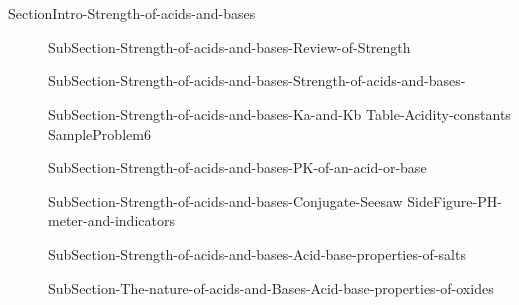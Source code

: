 \documentclass[main.tex]{subfiles}
\newcommand\chapterlabel{Ch-acidbase}\setcounter{figurenewcounter}{0}\setcounter{tablenewcounter}{0}\setcounter{formulanewcounter}{0}
\begin{document}
\section{\color{blue!30!black}{Strength of acids and bases}}{SectionIntro-Strength-of-acids-and-bases}
\sloppy\begin{description}
\item[] {SubSection-Strength-of-acids-and-bases-Review-of-Strength}
\item[] {SubSection-Strength-of-acids-and-bases-Strength-of-acids-and-bases-}
\item[] {SubSection-Strength-of-acids-and-bases-Ka-and-Kb}
  \newpage\hspace{4cm}  {Table-Acidity-constants}
   {SampleProblem6}
   \item[] {SubSection-Strength-of-acids-and-bases-PK-of-an-acid-or-base}
   \item[] {SubSection-Strength-of-acids-and-bases-Conjugate-Seesaw}
    {SideFigure-PH-meter-and-indicators}
   \item[] {SubSection-Strength-of-acids-and-bases-Acid-base-properties-of-salts}
      \item[] {SubSection-The-nature-of-acids-and-Bases-Acid-base-properties-of-oxides}
\end{description}
\end{document}
